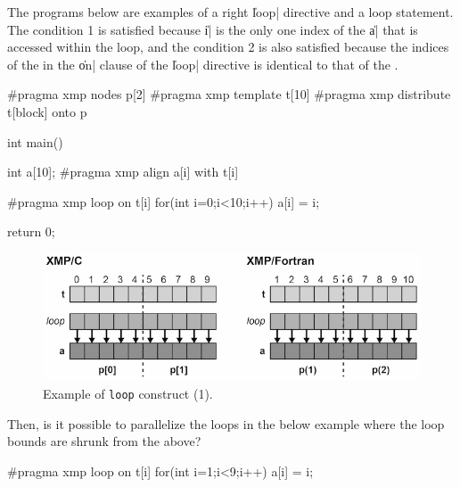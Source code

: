 
The programs below are examples of a right \|loop| directive and a loop
statement.
%
The condition 1 is satisfied because \|i| is the only one index
of the {\darray} \|a| that is accessed within the loop,
%
and the condition 2 is also satisfied because the indices of the
{\template} in the \|on| clause of the \|loop| directive is identical to that
of the {\darray}.

\begin{XCexample}
#pragma xmp nodes p[2]
#pragma xmp template t[10]
#pragma xmp distribute t[block] onto p

int main(){
  int a[10];
#pragma xmp align a[i] with t[i]

#pragma xmp loop on t[i]
  for(int i=0;i<10;i++)
    a[i] = i;

  return 0;
}
\end{XCexample}


\begin{figure}
  \centering
  \includegraphics[width=\textwidth]{figs/loop1.png}
  \caption{Example of {\tt loop} construct (1).}
\end{figure}

Then, is it possible to parallelize the loops in the below example where
the loop bounds are shrunk from the above?

\begin{XCexample}
#pragma xmp loop on t[i]
  for(int i=1;i<9;i++)
    a[i] = i;
\end{XCexample}

